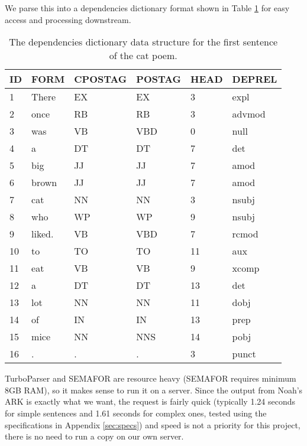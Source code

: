 We parse this into a dependencies dictionary format shown in Table \ref{tab:DepDict} for easy access and processing downstream.

\begin{table}
\centering
    \begin{tabular}{|l|l|l|l|l|l|}
    \hline
    ID & FORM   & CPOSTAG & POSTAG & HEAD & DEPREL \\ \hline
    1  & There  & EX      & EX     & 3    & expl   \\
    2  & once   & RB      & RB     & 3    & advmod \\
    3  & was    & VB      & VBD    & 0    & null   \\
    4  & a      & DT      & DT     & 7    & det    \\
    5  & big    & JJ      & JJ     & 7    & amod   \\
    6  & brown  & JJ      & JJ     & 7    & amod   \\
    7  & cat    & NN      & NN     & 3    & nsubj  \\
    8  & who    & WP      & WP     & 9    & nsubj  \\
    9  & liked. & VB      & VBD    & 7    & rcmod  \\
    10 & to     & TO      & TO     & 11   & aux    \\
    11 & eat    & VB      & VB     & 9    & xcomp  \\
    12 & a      & DT      & DT     & 13   & det    \\
    13 & lot    & NN      & NN     & 11   & dobj   \\
    14 & of     & IN      & IN     & 13   & prep   \\
    15 & mice   & NN      & NNS    & 14   & pobj   \\
    16 & .      & .       & .      & 3    & punct  \\ \hline
    \end{tabular}
\caption{The dependencies dictionary data structure for the first sentence of the cat poem.}
\label{tab:DepDict}
\end{table}

TurboParser and SEMAFOR are resource heavy (SEMAFOR requires minimum 8GB RAM), so it makes sense to run it on a server. Since the output from Noah's ARK is exactly what we want, the request is fairly quick (typically 1.24 seconds for simple sentences and 1.61 seconds for complex ones, tested using the specifications in Appendix \ref{sec:specs}) and speed is not a priority for this project, there is no need to run a copy on our own server.

